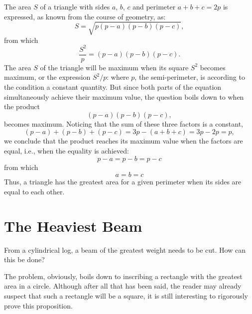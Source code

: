 \ans The area $S$ of a triangle with sides $a$, $b$, $c$ and perimeter $a + b + c = 2p$ is expressed, as known from the course of geometry, as:
\begin{equation*}%
S = \sqrt{p(p - a)(p - b)(p - c)},
\end{equation*}
from which
\begin{equation*}%
\frac{S^{2}}{p} = (p - a)(p - b)(p - c).
\end{equation*}
The area $S$ of the triangle will be maximum when its square $S^{2} $ becomes maximum, or the expression $S^{2}/p$: where $p$, the semi-perimeter, is according to the condition a constant quantity. But since both parts of the equation simultaneously achieve their maximum value, the question boils down to when the product
\begin{equation*}%
(p - a)(p - b)(p - c),
\end{equation*}
becomes maximum. Noticing that the sum of these three factors is a constant,
\begin{equation*}%
(p - a) + (p - b) + (p - c) = 3p - (a + b + c) = 3p - 2p = p,
\end{equation*}
we conclude that the product reaches its maximum value when the factors are equal, i.e., when the equality is achieved:
\begin{equation*}%
p - a = p - b = p - c
\end{equation*}
from which
\begin{equation*}%
a = b = c
\end{equation*}
Thus, a triangle has the greatest area for a given perimeter when its sides are equal to each other.

\section{The Heaviest Beam}
\label{sec-12.11}


\ques From a cylindrical log, a beam of the greatest weight needs to be cut. How can this be done?



\ans The problem, obviously, boils down to inscribing a rectangle with the greatest area in a circle. Although after all that has been said, the reader may already suspect that such a rectangle will be a square, it is still interesting to rigorously prove this proposition.


